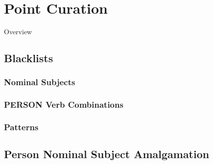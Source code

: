 \chapter{Point Curation\label{chap:point-curation}}
  Overview
  \section{Blacklists}
    \subsection{Nominal Subjects}
    \subsection{PERSON Verb Combinations}
    \subsection{Patterns}
  \section{Person Nominal Subject Amalgamation}
